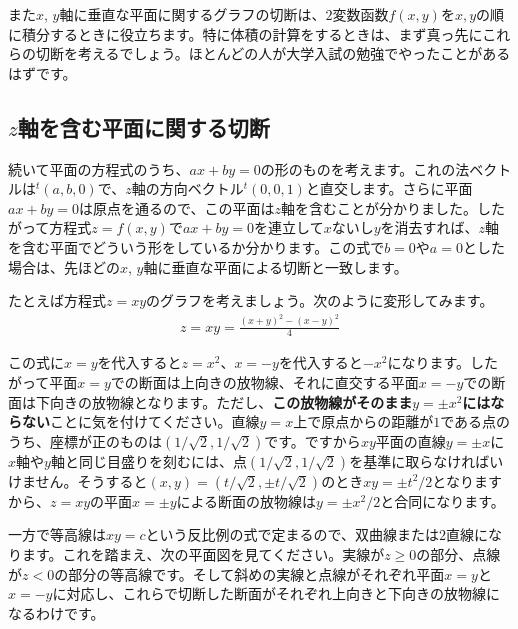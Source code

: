 また$x$, $y$軸に垂直な平面に関するグラフの切断は、$2$変数函数$f(x, y)$を$x, y$の順に積分するときに役立ちます。特に体積の計算をするときは、まず真っ先にこれらの切断を考えるでしょう。ほとんどの人が大学入試の勉強でやったことがあるはずです。

\subsection{$z$軸を含む平面に関する切断}

続いて平面の方程式のうち、$ax + by = 0$の形のものを考えます。これの法ベクトルは${}^t\!(a, b, 0)$で、$z$軸の方向ベクトル${}^t\!(0, 0, 1)$と直交します。さらに平面$ax + by = 0$は原点を通るので、この平面は$z$軸を含むことが分かりました。したがって方程式$z = f(x, y)$で$ax + by = 0$を連立して$x$ないし$y$を消去すれば、$z$軸を含む平面でどういう形をしているか分かります。この式で$b=0$や$a=0$とした場合は、先ほどの$x$, $y$軸に垂直な平面による切断と一致します。

たとえば方程式$z=xy$のグラフを考えましょう。次のように変形してみます。
\begin{align*}
z = xy = \frac{(x+y)^2 - (x-y)^2}{4}
\end{align*}

この式に$x=y$を代入すると$z=x^2$、$x=-y$を代入すると$-x^2$になります。したがって平面$x=y$での断面は上向きの放物線、それに直交する平面$x=-y$での断面は下向きの放物線となります。ただし、\textbf{この放物線がそのまま$y=\pm x^2$にはならない}ことに気を付けてください。直線$y = x$上で原点からの距離が$1$である点のうち、座標が正のものは$(1/\sqrt{2}, 1/\sqrt{2})$です。ですから$xy$平面の直線$y=\pm x$に$x$軸や$y$軸と同じ目盛りを刻むには、点$(1/\sqrt{2},1/\sqrt{2})$を基準に取らなければいけません。そうすると$(x,y) = (t/\sqrt{2},\pm t/\sqrt{2})$のとき$xy = \pm t^2/2$となりますから、$z = xy$の平面$x = \pm y$による断面の放物線は$y = \pm x^2/2$と合同になります。

一方で等高線は$xy = c$という反比例の式で定まるので、双曲線または$2$直線になります。これを踏まえ、次の平面図を見てください。実線が$z\geq 0$の部分、点線が$z<0$の部分の等高線です。そして斜めの実線と点線がそれぞれ平面$x=y$と$x=-y$に対応し、これらで切断した断面がそれぞれ上向きと下向きの放物線になるわけです。

